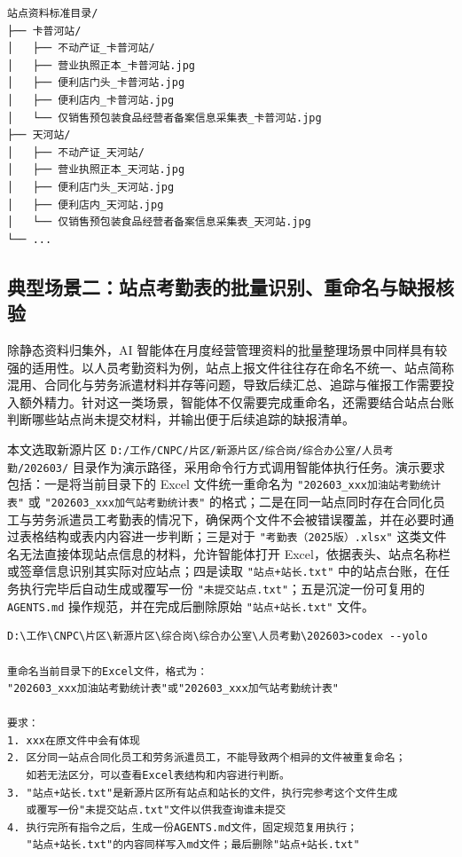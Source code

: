 \begin{lstlisting}[style=treeview,caption={整理后的示意性目录结构}]
站点资料标准目录/
├── 卡普河站/
│   ├── 不动产证_卡普河站/
│   ├── 营业执照正本_卡普河站.jpg
│   ├── 便利店门头_卡普河站.jpg
│   ├── 便利店内_卡普河站.jpg
│   └── 仅销售预包装食品经营者备案信息采集表_卡普河站.jpg
├── 天河站/
│   ├── 不动产证_天河站/
│   ├── 营业执照正本_天河站.jpg
│   ├── 便利店门头_天河站.jpg
│   ├── 便利店内_天河站.jpg
│   └── 仅销售预包装食品经营者备案信息采集表_天河站.jpg
└── ...
\end{lstlisting}

\subsection{典型场景二：站点考勤表的批量识别、重命名与缺报核验}

除静态资料归集外，AI 智能体在月度经营管理资料的批量整理场景中同样具有较强的适用性。以人员考勤资料为例，站点上报文件往往存在命名不统一、站点简称混用、合同化与劳务派遣材料并存等问题，导致后续汇总、追踪与催报工作需要投入额外精力。针对这一类场景，智能体不仅需要完成重命名，还需要结合站点台账判断哪些站点尚未提交材料，并输出便于后续追踪的缺报清单。

本文选取新源片区 \verb|D:/工作/CNPC/片区/新源片区/综合岗/综合办公室/人员考勤/202603/| 目录作为演示路径，采用命令行方式调用智能体执行任务。演示要求包括：一是将当前目录下的 Excel 文件统一重命名为 \lstinline|"202603_xxx加油站考勤统计表"| 或 \lstinline|"202603_xxx加气站考勤统计表"| 的格式；二是在同一站点同时存在合同化员工与劳务派遣员工考勤表的情况下，确保两个文件不会被错误覆盖，并在必要时通过表格结构或表内内容进一步判断；三是对于 \lstinline|"考勤表（2025版）.xlsx"| 这类文件名无法直接体现站点信息的材料，允许智能体打开 Excel，依据表头、站点名称栏或签章信息识别其实际对应站点；四是读取 \lstinline|"站点+站长.txt"| 中的站点台账，在任务执行完毕后自动生成或覆写一份 \lstinline|"未提交站点.txt"|；五是沉淀一份可复用的 \lstinline|AGENTS.md| 操作规范，并在完成后删除原始 \lstinline|"站点+站长.txt"| 文件。

\begin{codeexample}[htbp]
   \caption{命令行演示与任务指令}
   \begin{lstlisting}[style=cmdview]
D:\工作\CNPC\片区\新源片区\综合岗\综合办公室\人员考勤\202603>codex --yolo

重命名当前目录下的Excel文件，格式为：
"202603_xxx加油站考勤统计表"或"202603_xxx加气站考勤统计表"

要求：
1. xxx在原文件中会有体现
2. 区分同一站点合同化员工和劳务派遣员工，不能导致两个相异的文件被重复命名；
   如若无法区分，可以查看Excel表结构和内容进行判断。
3. "站点+站长.txt"是新源片区所有站点和站长的文件，执行完参考这个文件生成
   或覆写一份"未提交站点.txt"文件以供我查询谁未提交
4. 执行完所有指令之后，生成一份AGENTS.md文件，固定规范复用执行；
   "站点+站长.txt"的内容同样写入md文件；最后删除"站点+站长.txt"
\end{lstlisting}
\end{codeexample}

